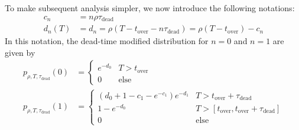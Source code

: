 \documentclass{article}
\newcommand{\dead}{\tau_{\text{dead}}}
\newcommand{\overlap}{t_{\text{over}}}
\begin{document}
To make subsequent analysis simpler, we now introduce the following notations:
\begin{subequations}
\begin{align}
	c_n &= n \rho \dead\\
	d_{n}(T) &= d_n = \rho(T - \overlap - n \dead) = \rho(T - \overlap) - c_n
\end{align}
\end{subequations}
In this notation, the dead-time modified distribution for $n=0$ and $n=1$ are given by
\begin{align*}
	 p_{\rho, T, \dead}(0)
	    &= \begin{cases}
			     e^{-d_0} & T > \overlap\\
				   0        & \text{else}
			   \end{cases}\\
	  p_{\rho, T, \dead}(1)
	    &= \begin{cases}
				(d_0 + 1 - c_1 - e^{-c_1})e^{-d_1} & T > \overlap + \dead\\
				1 - e^{-d_0}               & T > [\overlap, \overlap + \dead]\\
				   0        & \text{else}
			   \end{cases}\\
	\end{align*}
\end{document}
